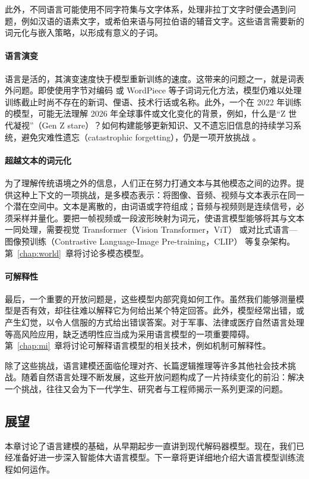此外，不同语言可能使用不同字符集与文字体系，处理非拉丁文字时便会遇到问题，例如汉语的语素文字，或希伯来语与阿拉伯语的辅音文字。这些语言需要新的词元化与嵌入策略，以形成有意义的子词。

\paragraph{语言演变}
语言是活的，其演变速度快于模型重新训练的速度。这带来的问题之一，就是词表外问题。即使使用字节对编码 \citep{gage1994new} 或 WordPiece \citep{song2021fast} 等子词词元化方法，模型仍难以处理训练截止时尚不存在的新词、俚语、技术行话或名称。此外，一个在 2022 年训练的模型，可能无法理解 2026 年全球事件或文化变化的背景，例如，什么是“Z 世代凝视”（Gen Z stare）？如何构建能够更新知识、又不遗忘旧信息的持续学习系统，避免灾难性遗忘（catastrophic forgetting），仍是一项开放挑战 \citep{wu2024continual}。

\paragraph{超越文本的词元化}
为了理解传统语境之外的信息，人们正在努力打通文本与其他模态之间的边界。提供这种上下文的一项挑战，是多模态表示：将图像、音频、视频与文本表示在同一个潜在空间中。文本是离散的，由词语或字符组成；音频与视频则是连续信号，必须采样并量化。要把一帧视频或一段波形映射为词元，使语言模型能够将其与文本一同处理，需要视觉 Transformer（Vision Transformer，ViT）\citep{han2022survey} 或对比式语言—图像预训练（Contrastive Language-Image Pre-training，CLIP）\citep{radford2021learning} 等复杂架构。第~\ref{chap:world}~章将讨论多模态模型。

\paragraph{可解释性}
最后，一个重要的开放问题是，这些模型内部究竟如何工作。虽然我们能够测量模型是否有效，却往往难以解释它为何给出某个特定回答。此外，模型经常出错，或产生幻觉，以令人信服的方式给出错误答案。对于军事、法律或医疗自然语言处理等高风险应用，缺乏透明性应当成为采用语言模型的一项重要障碍。第~\ref{chap:mi}~章将讨论可解释语言模型的相关技术，例如机制可解释性。

除了这些挑战，语言建模还面临伦理对齐、长篇逻辑推理等许多其他社会技术挑战。随着自然语言处理不断发展，这些开放问题构成了一片持续变化的前沿：解决一个挑战，往往又会为下一代学生、研究者与工程师揭示一系列更深的问题。

\subsection{展望}
本章讨论了语言建模的基础，从早期起步一直讲到现代解码器模型。现在，我们已经准备好进一步深入智能体大语言模型。下一章将更详细地介绍大语言模型训练流程如何运作。



